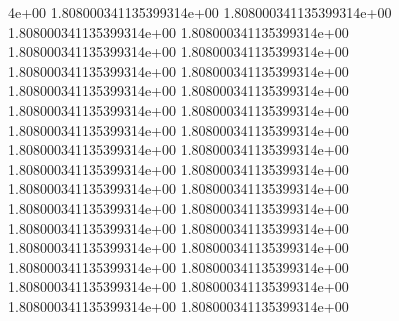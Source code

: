 4e+00	1.808000341135399314e+00	1.808000341135399314e+00	1.808000341135399314e+00	1.808000341135399314e+00	1.808000341135399314e+00	1.808000341135399314e+00	1.808000341135399314e+00	1.808000341135399314e+00	1.808000341135399314e+00	1.808000341135399314e+00	1.808000341135399314e+00	1.808000341135399314e+00	1.808000341135399314e+00	1.808000341135399314e+00	1.808000341135399314e+00	1.808000341135399314e+00	1.808000341135399314e+00	1.808000341135399314e+00	1.808000341135399314e+00	1.808000341135399314e+00	1.808000341135399314e+00	1.808000341135399314e+00	1.808000341135399314e+00	1.808000341135399314e+00	1.808000341135399314e+00	1.808000341135399314e+00	1.808000341135399314e+00	1.808000341135399314e+00	1.808000341135399314e+00	1.808000341135399314e+00	1.808000341135399314e+00	1.808000341135399314e+00
